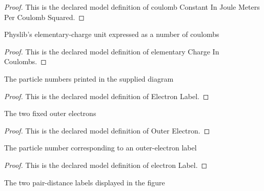 \begin{proof}
  This is the declared model definition of coulomb Constant In Joule Meters Per Coulomb Squared.
\end{proof}
\begin{definition}
  \label{def:physics:phyx-mini-0853:phyxminiproblems-problemphyxmini0853-elementarychargeincoulombs}
  Physlib's elementary-charge unit expressed as a number of coulombs
\end{definition}
\begin{proof}
  This is the declared model definition of elementary Charge In Coulombs.
\end{proof}
\begin{definition}
  \label{def:physics:phyx-mini-0853:phyxminiproblems-problemphyxmini0853-electronlabel}
  The particle numbers printed in the supplied diagram
\end{definition}
\begin{proof}
  This is the declared model definition of Electron Label.
\end{proof}
\begin{definition}
  \label{def:physics:phyx-mini-0853:phyxminiproblems-problemphyxmini0853-outerelectron}
  The two fixed outer electrons
\end{definition}
\begin{proof}
  This is the declared model definition of Outer Electron.
\end{proof}
\begin{definition}
  \label{def:physics:phyx-mini-0853:phyxminiproblems-problemphyxmini0853-outerelectron-electronlabel}
  The particle number corresponding to an outer-electron label
\end{definition}
\begin{proof}
  This is the declared model definition of electron Label.
\end{proof}
\begin{definition}
  \label{def:physics:phyx-mini-0853:phyxminiproblems-problemphyxmini0853-centerouterpair}
  The two pair-distance labels displayed in the figure
\end{definition}

